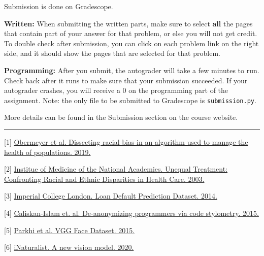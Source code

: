 \documentclass{article}
\theoremstyle{case}
\theoremstyle{definition}
\begin{document}
Submission is done on Gradescope.

\textbf{Written:} When submitting the written parts, make sure to select \textbf{all} the pages that contain part of your answer for that problem, or else you will not get credit. To double check after submission, you can click on each problem link on the right side, and it should show the pages that are selected for that problem.

\textbf{Programming:} After you submit, the autograder will take a few minutes to run. Check back after it runs to make sure that your submission succeeded. If your autograder crashes, you will receive a 0 on the programming part of the assignment. Note: the only file to be submitted to Gradescope is \texttt{submission.py}.

More details can be found in the Submission section on the course website.

\hrule
\vspace{0.5em}

[1] \href{https://doi.org/10.1126/science.aax2342}{Obermeyer et al. Dissecting racial bias in an algorithm used to manage the health of populations. 2019.}

[2] \href{https://www.nap.edu/catalog/10260/unequal-treatment-confronting-racial-and-ethnic-disparities-in-health-care}{Institue of Medicine of the National Academies. Unequal Treatment: Confronting Racial and Ethnic Disparities in Health Care. 2003.}

[3] \href{https://www.kaggle.com/c/loan-default-prediction/data}{Imperial College London. Loan Default Prediction Dataset. 2014.}

[4] \href{https://dl.acm.org/doi/10.5555/2831143.2831160}{Caliskan-Islam et. al. De-anonymizing programmers via code stylometry. 2015.}

[5] \href{https://www.robots.ox.ac.uk/~vgg/data/vgg_face/}{Parkhi et al. VGG Face Dataset. 2015.}

[6] \href{https://www.inaturalist.org/blog/31806-a-new-vision-model}{iNaturalist. A new vision model. 2020.}
\end{document}
